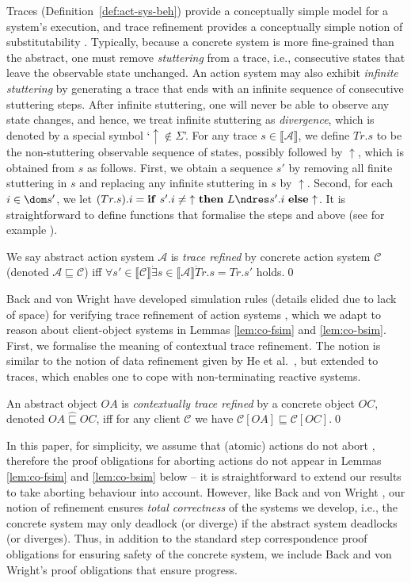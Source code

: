 \documentclass[11pt]{llncs}
\def \endbox{\hfill \qed}
\newcommand{\beh}[1]{\llbracket #1 \rrbracket}
\def \diverge {{\mathop \uparrow}}
\def \all  {\forall}
\def \sref  {\sqsubseteq}
\def \srefc  {\mathbin{\widehat{\sqsubseteq}}}
\newcommand{\msA}{\mathscr{A}}
\newcommand{\msC}{\mathscr{C}}
\newcommand{\mcC}{\mathcal{C}}
\newcommand{\refdef}[1]{Definition~\ref{#1}}
\begin{document}
Traces (\refdef{def:act-sys-beh}) provide a conceptually simple model
for a system's execution, and trace refinement provides a conceptually
simple notion of substitutability \cite{back94trace}. Typically,
because a concrete system is more fine-grained than the abstract, one
must remove \emph{stuttering} from a trace, i.e., consecutive states
that leave the observable state unchanged. An action system may also
exhibit \emph{infinite stuttering} by generating a trace that ends
with an infinite sequence of consecutive stuttering steps. After
infinite stuttering, one will never be able to observe any state
changes, and hence, we treat infinite stuttering as \emph{divergence},
which is denoted by a special symbol `$\diverge \notin \Sigma$'.  For
any trace $s \in \llbracket \msA \rrbracket $, we define $Tr.s$ to be
the non-stuttering observable sequence of states, possibly followed by
$\diverge$, which is obtained from $s$ as follows. First, we obtain a
sequence $s'$ by removing all finite stuttering in $s$ and replacing
any infinite stuttering in $s$ by $\diverge$. Second, for each
$i \in \dom s'$, we let
$(Tr.s).i = {\bf if}\ s'.i \neq \diverge\ {\bf then}\ L \ndres s'.i\
{\bf else}\ \diverge$.
It is straightforward to define functions that formalise the steps and
above (see for example \cite{Don09}).
\begin{definition}
  We say abstract action system $\msA$ is \emph{trace refined} by
  concrete action system $\msC$ (denoted $\msA \sref \msC$) iff $\all
  s' \in \beh{\msC} \dot \exists s \in \beh{\msA} \dot Tr.s = Tr.s'$
  holds.\endbox
\end{definition}
Back and von Wright have developed simulation rules (details elided
due to lack of space) for verifying trace refinement of action systems
\cite{back94trace}, which we adapt to reason about client-object
systems in Lemmas \ref{lem:co-fsim} and \ref{lem:co-bsim}. First, we
formalise the meaning of contextual trace refinement.  The notion is
similar to the notion of data refinement given by He et al.\
\cite{HeHS86,deRoever98}, but extended to traces, which enables one to
cope with non-terminating reactive systems.
\begin{definition}
  An abstract object $OA$ is \emph{contextually trace refined} by a
  concrete object $OC$, denoted $OA \srefc OC$, iff for any client
  $\mcC$ we have $\mcC[OA] \sref \mcC[OC]$.\endbox
\end{definition}




In this paper, for simplicity, we assume that (atomic) actions do not
abort \cite{deRoever98}, therefore the proof obligations for aborting
actions do not appear in Lemmas \ref{lem:co-fsim} and
\ref{lem:co-bsim} below -- it is straightforward to extend our results
to take aborting behaviour into account. However, like Back and von
Wright \cite{back94trace}, our notion of refinement ensures
\emph{total correctness} of the systems we develop, i.e., the concrete
system may only deadlock (or diverge) if the abstract system deadlocks
(or diverges). Thus, in addition to the standard step correspondence
proof obligations for ensuring safety of the concrete system, we
include Back and von Wright's proof obligations that ensure progress.
\end{document}
